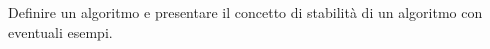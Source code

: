 Definire un algoritmo e presentare il concetto di stabilit\`{a} di 
un algoritmo con eventuali esempi.
